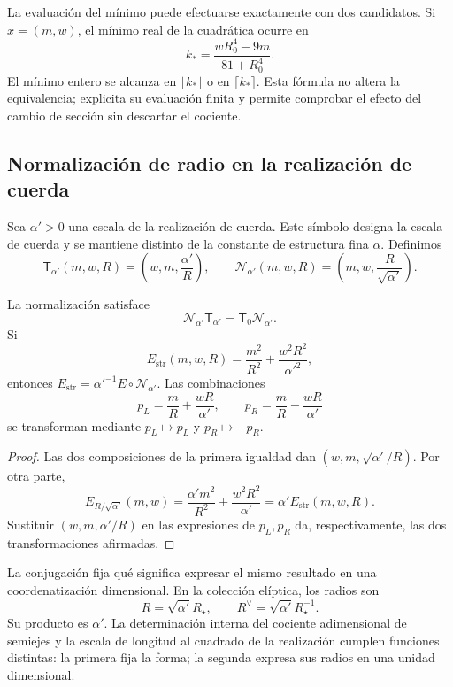 La evaluación del mínimo puede efectuarse exactamente con dos
candidatos. Si \(x=(m,w)\), el mínimo real de la cuadrática
ocurre en
\[
 k_* =\frac{wR_0^4-9m}{81+R_0^4}.
\]
El mínimo entero se alcanza en \(\lfloor k_*\rfloor\) o en
\(\lceil k_*\rceil\). Esta fórmula no altera la equivalencia;
explicita su evaluación finita y permite comprobar el efecto
del cambio de sección sin descartar el cociente.

\subsection{Normalización de radio en la realización de cuerda}

Sea \(\alpha'>0\) una escala de la realización de cuerda.
Este símbolo designa la escala de cuerda y se mantiene distinto
de la constante de estructura fina \(\alpha\). Definimos
\begin{equation}
 \mathsf T_{\alpha'}(m,w,R)
 =\left(w,m,\frac{\alpha'}R\right),\qquad
 \mathcal N_{\alpha'}(m,w,R)
 =\left(m,w,\frac R{\sqrt{\alpha'}}\right).
 \label{iv:eq:normalizacion-cuerda}
\end{equation}

\begin{theorem}
\label{iv:thm:normalizacion-cuerda}
La normalización satisface
\[
 \mathcal N_{\alpha'}\mathsf T_{\alpha'}
 =\mathsf T_0\mathcal N_{\alpha'}.
\]
Si
\[
 E_{\mathrm{str}}(m,w,R)
 =\frac{m^2}{R^2}+\frac{w^2R^2}{\alpha'^2},
\]
entonces
\(E_{\mathrm{str}}=\alpha'^{-1}E\circ\mathcal N_{\alpha'}\).
Las combinaciones
\[
 p_L=\frac mR+\frac{wR}{\alpha'},\qquad
 p_R=\frac mR-\frac{wR}{\alpha'}
\]
se transforman mediante \(p_L\mapsto p_L\) y \(p_R\mapsto-p_R\).
\end{theorem}
\begin{proof}
Las dos composiciones de la primera igualdad dan
\((w,m,\sqrt{\alpha'}/R)\). Por otra parte,
\[
 E_{R/\sqrt{\alpha'}}(m,w)
 =\frac{\alpha'm^2}{R^2}+\frac{w^2R^2}{\alpha'}
 =\alpha'E_{\mathrm{str}}(m,w,R).
\]
Sustituir \((w,m,\alpha'/R)\) en las expresiones de
\(p_L,p_R\) da, respectivamente, las dos transformaciones
afirmadas.
\end{proof}

La conjugación fija qué significa expresar el mismo resultado en
una coordenatización dimensional. En la colección elíptica, los radios son
\[
 R=\sqrt{\alpha'}R_\star,\qquad
 R^\vee=\sqrt{\alpha'}R_\star^{-1}.
\]
Su producto es \(\alpha'\). La determinación interna del cociente
adimensional de semiejes y la escala de longitud al cuadrado de la
realización cumplen funciones distintas: la primera fija la forma;
la segunda expresa sus radios en una unidad dimensional.

